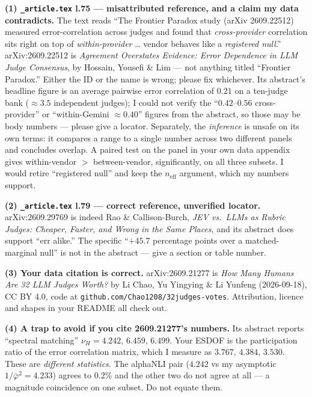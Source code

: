 \documentclass[11pt]{article}
\theoremstyle{definition}
\newcommand{\phib}{\bar\varphi}
\begin{document}
\textbf{(1) \texttt{\_article.tex} l.75 --- misattributed reference, and a claim my
data contradicts.} The text reads ``The Frontier Paradox study (arXiv 2609.22512)
measured error-correlation across judges and found that \emph{cross-provider}
correlation sits right on top of \emph{within-provider} \ldots{} vendor behaves like a
\emph{registered null}.'' arXiv:2609.22512 is \emph{Agreement Overstates Evidence:
Error Dependence in LLM Judge Consensus}, by Hossain, Yousefi \& Lim --- not
anything titled ``Frontier Paradox.'' Either the ID or the name is wrong; please fix
whichever. Its abstract's headline figure is an average pairwise error correlation of
$0.21$ on a ten-judge bank ($\approx3.5$ independent judges); I could not verify the
``$0.42$--$0.56$ cross-provider'' or ``within-Gemini $\approx0.40$'' figures from the
abstract, so those may be body numbers --- please give a locator. Separately, the
\emph{inference} is unsafe on its own terms: it compares a range to a single number
across two different panels and concludes overlap. A paired test on the panel in your
own data appendix gives within-vendor $>$ between-vendor, significantly, on all
three subsets. I would retire ``registered null'' and keep the $n_{\mathrm{eff}}$
argument, which my numbers support.

\textbf{(2) \texttt{\_article.tex} l.79 --- correct reference, unverified locator.}
arXiv:2609.29769 is indeed Rao \& Callison-Burch, \emph{JEV vs.\ LLMs as Rubric
Judges: Cheaper, Faster, and Wrong in the Same Places}, and its abstract does support
``err alike.'' The specific ``$+45.7$ percentage points over a matched-marginal
null'' is not in the abstract --- give a section or table number.

\textbf{(3) Your data citation is correct.} arXiv:2609.21277 is \emph{How Many Humans
Are 32 LLM Judges Worth?} by Li Chao, Yu Yingying \& Li Yunfeng (2026-09-18), CC
BY 4.0, code at \texttt{github.com/Chao1208/32judges-votes}. Attribution, licence and
shapes in your README all check out.

\textbf{(4) A trap to avoid if you cite 2609.21277's numbers.} Its abstract reports
``spectral matching'' $\nu_H=4.242,\,6.459,\,6.499$. Your ESDOF is the participation
ratio of the error correlation matrix, which I measure as $3.767,\,4.384,\,3.530$.
These are \emph{different statistics}. The alphaNLI pair ($4.242$ vs my asymptotic
$1/\phib^2=4.233$) agrees to $0.2\%$ and the other two do not agree at all --- a
magnitude coincidence on one subset. Do not equate them.
\end{document}
